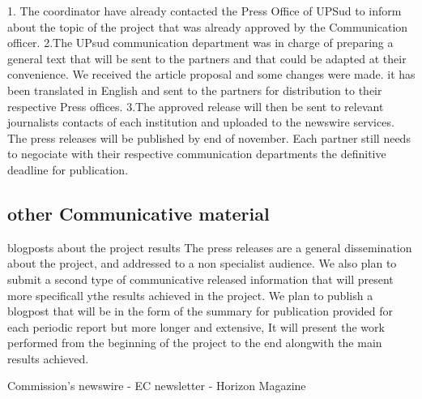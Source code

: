 \documentclass{deliverablereport}
\begin{document}
 1. The coordinator have already contacted the Press Office of UPSud to inform about the topic
 of the project that was already approved by the Communication officer. 
 2.The UPsud communication department was in charge of preparing a general text that will be sent
 to the partners and that could be adapted at their convenience. We received the article proposal 
 and some changes were made. it has been translated in English and sent to the partners 
 for distribution to their respective Press offices. 
 3.The approved release will then be sent to relevant journalists contacts of each institution 
 and uploaded to the newswire services. The press releases will be published by end of november. 
 Each partner still needs to negociate with their respective communication departments the 
 definitive deadline for publication.



\subsection{other Communicative material}

 \item blogposts about the project results
 The press releases are a general dissemination about the project, and addressed to 
 a non specialist audience. We also plan to submit a second type of communicative released 
 information that will present more specificall ythe results achieved in the project.
 We plan to publish a blogpost that will be in the form of the summary for publication
 provided for each periodic report but more longer and  extensive, It will present the 
 work performed from the beginning of the project to the end alongwith the main results achieved.
 
 \European Commission's newswire
 - EC newsletter
 - Horizon Magazine
\end{document}
